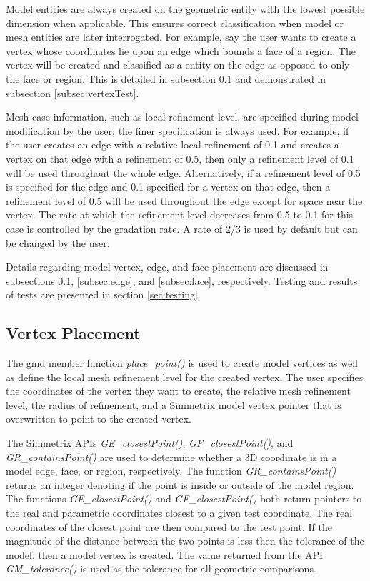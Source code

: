 \documentclass[a4paper, 12pt]{article}
\begin{document}
Model entities are always created on the geometric entity with the
lowest possible dimension when applicable. This ensures correct classification when model
or mesh entities are later interrogated. For example, say the
user wants to create a vertex whose coordinates lie upon an edge
which bounds a face of a region. The vertex will be created and 
classified as a entity on the edge as opposed to only the face or region. 
This is detailed in subsection \ref{subsec:vertex} and  demonstrated 
in subsection \ref{subsec:vertexTest}.

Mesh case information, such as local refinement level, are
specified during model modification by the user; the finer
specification is always used. For example, if the user 
creates an edge with a relative local refinement of 0.1
and creates a vertex on that edge with a refinement of 0.5, 
then only a refinement level of 0.1 will be used throughout 
the whole edge. Alternatively, if a refinement level of 0.5 
is specified for the edge and 0.1 specified for a vertex on that
edge, then a refinement level of 0.5 will be used throughout the 
edge except for space near the vertex. The rate at which the 
refinement level decreases from 0.5 to 0.1 for this case is controlled
by the gradation rate. A rate of 2/3 is used by default 
but can be changed by the user. 

Details regarding model vertex, edge, and face placement are 
discussed in subsections \ref{subsec:vertex}, \ref{subsec:edge}, 
and \ref{subsec:face}, respectively. Testing and results of tests
are presented in section \ref{sec:testing}.

\subsection{Vertex Placement} \label{subsec:vertex}
The gmd member function \emph{place\_point()} is used to create model
vertices as well as define the local mesh refinement level for the created vertex.
The user specifies the coordinates of the vertex they want to create, the 
relative mesh refinement level, the radius of refinement, and a Simmetrix
model vertex pointer that is overwritten to point to the created vertex. 

The Simmetrix APIs \emph{GE\_closestPoint()}, \emph{GF\_closestPoint()}, 
and \emph{GR\_containsPoint()} are used to determine whether a 3D coordinate 
is in a model edge, face, or region, respectively. The function \emph{GR\_containsPoint()}
returns an integer denoting if the point is inside or outside of the model region. 
The functions \emph{GE\_closestPoint()} and \emph{GF\_closestPoint()} both return 
pointers to the real and parametric coordinates closest to a given test coordinate. 
The real coordinates of the closest point are then compared to the test point.
If the magnitude of the distance between the two points is less then the 
tolerance of the model, then a model vertex is created. 
The value returned from the API \emph{GM\_tolerance()} is used as the 
tolerance for all geometric comparisons. 
\end{document}

